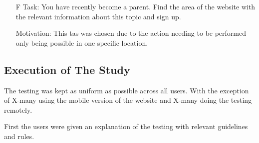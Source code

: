 \begin{itemize}
    \item[F] Task: You have recently become a parent. 
    Find the area of the website with the relevant information about this topic and sign up.
    \item[] Motivation: This tas was chosen due to the action needing to be performed only being possible in one specific location. 
    
\end{itemize}

\subsection{Execution of The Study}


The testing was kept as uniform as possible across all users. With the exception of X-many using the mobile version of the website and X-many doing the testing remotely. 

First the users were given an explanation of the testing with relevant guidelines and rules.  

